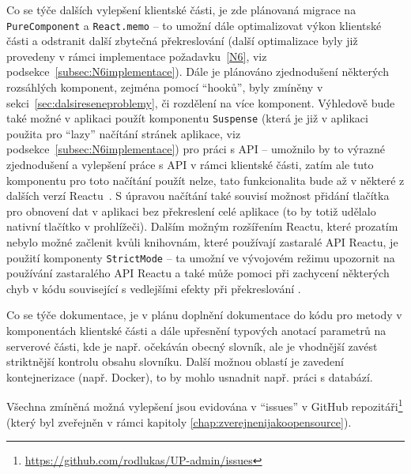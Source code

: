 Co se týče dalších vylepšení klientské části, je zde plánovaná migrace na \verb|PureComponent| a \verb|React.memo| -- to umožní dále optimalizovat výkon klientské části a odstranit další zbytečná překreslování \cite{react-docs-api} (další optimalizace byly již provedeny v rámci implementace požadavku~\ref{N6}, viz podsekce~\ref{subsec:N6implementace}). Dále je plánováno zjednodušení některých rozsáhlých komponent, zejména pomocí \enquote{hooků}, byly zmíněny v sekci~\ref{sec:dalsireseneproblemy}, či rozdělení na více komponent. Výhledově bude také možné v aplikaci použít komponentu \verb|Suspense| (která je již v aplikaci použita pro \enquote{lazy} načítání stránek aplikace, viz podsekce~\ref{subsec:N6implementace}) pro práci s API -- umožnilo by to výrazné zjednodušení a vylepšení práce s API v rámci klientské části, zatím ale tuto komponentu pro toto načítání použít nelze, tato funkcionalita bude až v některé z dalších verzí Reactu~\cite{react-blog-roadmap}. S úpravou načítání také souvisí možnost přidání tlačítka pro obnovení dat v aplikaci bez překreslení celé aplikace (to by totiž udělalo nativní tlačítko v prohlížeči). Dalším možným rozšířením Reactu, které prozatím nebylo možné začlenit kvůli knihovnám, které používají zastaralé API Reactu, je použití komponenty \verb|StrictMode| -- ta umožní ve vývojovém režimu upozornit na používání zastaralého API Reactu a také může pomoci při zachycení některých chyb v kódu související s vedlejšími efekty při překreslování \cite{react-docs-strictmode}.

Co se týče dokumentace, je v plánu doplnění dokumentace do kódu pro metody v komponentách klientské části a dále upřesnění typových anotací parametrů na serverové části, kde je např. očekáván obecný slovník, ale je vhodnější zavést striktnější kontrolu obsahu slovníku. Další možnou oblastí je zavedení kontejnerizace (např. Docker), to by mohlo usnadnit např. práci s databází.

Všechna zmíněná možná vylepšení jsou evidována v \enquote{issues} v GitHub repozitáři\footnote{\url{https://github.com/rodlukas/UP-admin/issues}} (který byl zveřejněn v rámci kapitoly \ref{chap:zverejnenijakoopensource}).
